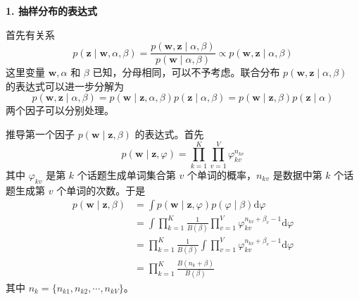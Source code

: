 \documentclass[UTF8, 12pt, fontset=fandol, oneside]{ctexart}
\begin{document}
\noindent\textbf{1. 抽样分布的表达式}

首先有关系
\begin{equation}
p(\mathbf{z}\mid\mathbf{w},\alpha,\beta)=\frac{p(\mathbf{w},\mathbf{z}\mid\alpha,\beta)}{p(\mathbf{w}\mid\alpha,\beta)}\propto p(\mathbf{w},\mathbf{z}\mid\alpha,\beta)
\tag{20.20}
\end{equation}
这里变量 $\mathbf{w},\alpha$ 和 $\beta$ 已知，分母相同，可以不予考虑。联合分布 $p(\mathbf{w},\mathbf{z}\mid\alpha,\beta)$ 的表达式可以进一步分解为
\begin{equation}
p(\mathbf{w},\mathbf{z}\mid\alpha,\beta)=p(\mathbf{w}\mid\mathbf{z},\alpha,\beta)p(\mathbf{z}\mid\alpha,\beta)=p(\mathbf{w}\mid\mathbf{z},\beta)p(\mathbf{z}\mid\alpha)
\tag{20.21}
\end{equation}
两个因子可以分别处理。

推导第一个因子 $p(\mathbf{w}\mid\mathbf{z},\beta)$ 的表达式。首先
\begin{equation}
p(\mathbf{w}\mid\mathbf{z},\varphi)=\prod_{k=1}^K\prod_{v=1}^V \varphi_{kv}^{n_{kv}}
\tag{20.22}
\end{equation}
其中 $\varphi_{kv}$ 是第 $k$ 个话题生成单词集合第 $v$ 个单词的概率，$n_{kv}$ 是数据中第 $k$ 个话题生成第 $v$ 个单词的次数。于是
\begin{equation}
\begin{aligned}
p(\mathbf{w}\mid\mathbf{z},\beta)
&=\int p(\mathbf{w}\mid\mathbf{z},\varphi)p(\varphi\mid\beta)\mathrm{d}\varphi\\
&=\int \prod_{k=1}^K \frac{1}{B(\beta)}\prod_{v=1}^V \varphi_{kv}^{n_{kv}+\beta_v-1}\mathrm{d}\varphi\\
&=\prod_{k=1}^K \frac{1}{B(\beta)}\int \prod_{v=1}^V \varphi_{kv}^{n_{kv}+\beta_v-1}\mathrm{d}\varphi\\
&=\prod_{k=1}^K \frac{B(n_k+\beta)}{B(\beta)}
\end{aligned}
\tag{20.23}
\end{equation}
其中 $n_k=\{n_{k1},n_{k2},\cdots,n_{kV}\}$。
\end{document}
